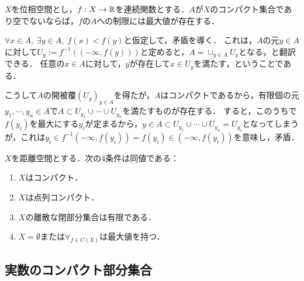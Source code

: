 \documentclass[uplatex,dvipdfmx]{jsreport}
\begin{document}
\begin{proposition}\label{prop-maximum-value-theorem}
    $X$を位相空間とし，$f:X\to\mathbb{R}$を連続関数とする．$A$が$X$のコンパクト集合であり空でないならば，$f$の$A$への制限には最大値が存在する．
\end{proposition}
\begin{Proof}
    $\forall x\in A,\;\exists y\in A,\; f(x)<f(y)$と仮定して，矛盾を導く．
    これは，$A$の元$y\in A$に対して$U_y:=f^{-1}((-\infty,f(y)))$と定めると，$A=\cup_{y\in A}U_y$となる，と翻訳できる．
    任意の$x\in A$に対して，$y$が存在して$x\in U_y$を満たす，ということである．

    こうして$A$の開被覆$(U_y)_{y\in A}$を得たが，$A$はコンパクトであるから，有限個の元$y_1,\cdots,y_n\in A$で$A\subset U_{y_1}\cup\cdots\cup U_{y_n}$を満たすものが存在する．
    すると，このうちで$f(y_i)$を最大にする$y_i$が定まるから，$y\in A\subset U_{y_1}\cup\cdots\cup U_{y_n}=U_{y_i}$となってしまうが，これは$y_i\in f^{-1}(-\infty,f(y_i))=f(y_i)\in(-\infty,f(y_i))$を意味し，矛盾．
\end{Proof}

\begin{proposition}
    $X$を距離空間とする．次の4条件は同値である：
    \begin{enumerate}
        \item $X$はコンパクト．
        \item $X$は点列コンパクト．
        \item $X$の離散な閉部分集合は有限である．
        \item $X=\emptyset$または$\forall_{f\in C(X)}$は最大値を持つ．
    \end{enumerate}
\end{proposition}

\subsection{実数のコンパクト部分集合}
\end{document}
